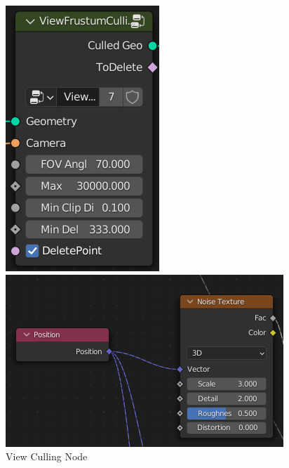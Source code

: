 \begin{figure}[!htb]
\begin{minipage}{0.21\textwidth}
     \includegraphics[width=\linewidth]{src/img/vegetation/3-culling.jpg}
     \caption{View Culling Node}
     \label{fig:veg-culling}
   \end{minipage}\hfill
   \begin{minipage}{0.53\textwidth}
     \centering
     \includegraphics[width=.97\linewidth]{src/img/vegetation/4-noise-texture.jpg}

\end{minipage}
\end{figure}
